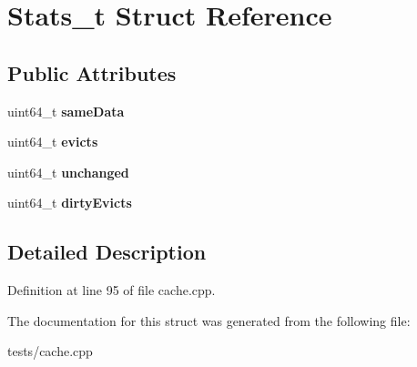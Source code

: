 \hypertarget{structStats__t}{\section{Stats\-\_\-t Struct Reference}
\label{structStats__t}
}
\subsection*{Public Attributes}
\begin{DoxyCompactItemize}
\item 
\hypertarget{structStats__t_aedf7c3773cf8c70229e5a04b65be962f}{uint64\-\_\-t {\bfseries same\-Data}}\label{structStats__t_aedf7c3773cf8c70229e5a04b65be962f}

\item 
\hypertarget{structStats__t_ae3a25d4e29b08596e4846f1b641a8f35}{uint64\-\_\-t {\bfseries evicts}}\label{structStats__t_ae3a25d4e29b08596e4846f1b641a8f35}

\item 
\hypertarget{structStats__t_a9793ef1d6984be53f2807d0304aed525}{uint64\-\_\-t {\bfseries unchanged}}\label{structStats__t_a9793ef1d6984be53f2807d0304aed525}

\item 
\hypertarget{structStats__t_aca1d4d28463094d5753db227eb181945}{uint64\-\_\-t {\bfseries dirty\-Evicts}}\label{structStats__t_aca1d4d28463094d5753db227eb181945}

\end{DoxyCompactItemize}


\subsection{Detailed Description}


Definition at line 95 of file cache.\-cpp.



The documentation for this struct was generated from the following file\-:\begin{DoxyCompactItemize}
\item 
tests/cache.\-cpp\end{DoxyCompactItemize}

